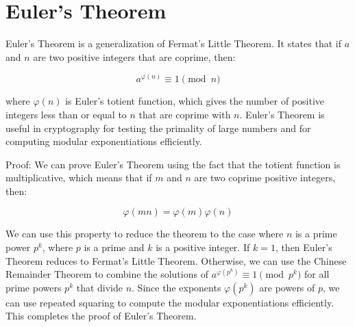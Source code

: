 \documentclass[12pt,openany]{book}
\theoremstyle{definition}
\begin{document}
	\newpage
	\section{Euler's Theorem}
	
	Euler's Theorem is a generalization of Fermat's Little Theorem. It states that if $a$ and $n$ are two positive integers that are coprime, then:
	
	$$a^{\varphi(n)} \equiv 1 \pmod{n}$$
	
	where $\varphi(n)$ is Euler's totient function, which gives the number of positive integers less than or equal to $n$ that are coprime with $n$. Euler's Theorem is useful in cryptography for testing the primality of large numbers and for computing modular exponentiations efficiently.
	
	Proof: We can prove Euler's Theorem using the fact that the totient function is multiplicative, which means that if $m$ and $n$ are two coprime positive integers, then:
	
	$$\varphi(mn) = \varphi(m) \varphi(n)$$
	
	We can use this property to reduce the theorem to the case where $n$ is a prime power $p^k$, where $p$ is a prime and $k$ is a positive integer. If $k=1$, then Euler's Theorem reduces to Fermat's Little Theorem. Otherwise, we can use the Chinese Remainder Theorem to combine the solutions of $a^{\varphi(p^k)} \equiv 1 \pmod{p^k}$ for all prime powers $p^k$ that divide $n$. Since the exponents $\varphi(p^k)$ are powers of $p$, we can use repeated squaring to compute the modular exponentiations efficiently. This completes the proof of Euler's Theorem.
	
\end{document}
